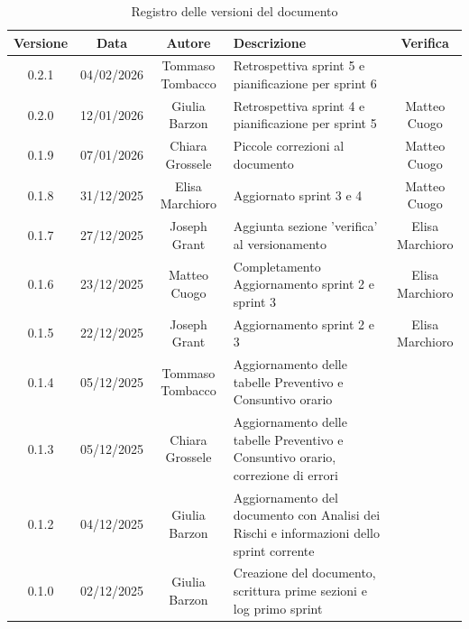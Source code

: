 \documentclass[11pt,a4paper]{article}
\begin{document}
\begin{table}[H]
    \centering
    \begin{tabular}{|c|c|c|>{\raggedright\arraybackslash}p{}|c|}
        \hline
        \textbf{Versione} & \textbf{Data} & \textbf{Autore} & \textbf{Descrizione} & \textbf{Verifica} \\
        \hline
        0.2.1 & 04/02/2026 & Tommaso Tombacco & Retrospettiva sprint 5 e pianificazione per sprint 6 & \\
        \hline
        0.2.0 & 12/01/2026 & Giulia Barzon & Retrospettiva sprint 4 e pianificazione per sprint 5 & Matteo Cuogo\\
        \hline
        0.1.9 & 07/01/2026 & Chiara Grossele & Piccole correzioni al documento & Matteo Cuogo\\ 
        \hline
        0.1.8 & 31/12/2025 & Elisa Marchioro & Aggiornato sprint 3 e 4 & Matteo Cuogo\\ \hline
        0.1.7 & 27/12/2025 & Joseph Grant & Aggiunta sezione 'verifica' al versionamento & Elisa Marchioro\\ \hline
        0.1.6 & 23/12/2025 & Matteo Cuogo & Completamento Aggiornamento sprint 2 e sprint 3 & Elisa Marchioro\\
        \hline
        0.1.5 & 22/12/2025 & Joseph Grant & Aggiornamento sprint 2 e 3 & Elisa Marchioro\\
        \hline
        0.1.4 & 05/12/2025 & Tommaso Tombacco & Aggiornamento delle tabelle Preventivo e Consuntivo orario & \\
        \hline
        0.1.3 & 05/12/2025 & Chiara Grossele & Aggiornamento delle tabelle Preventivo e Consuntivo orario, correzione di errori & \\
        \hline
        0.1.2 & 04/12/2025 & Giulia Barzon & Aggiornamento del documento con Analisi dei Rischi e informazioni dello sprint corrente & \\
        \hline
        0.1.0 & 02/12/2025 & Giulia Barzon & Creazione del documento, scrittura prime sezioni e log primo sprint & \\
        \hline
    \end{tabular}
    \caption{Registro delle versioni del documento}
    \label{tab:versionamento}
\end{table}

\newpage

\tableofcontents
\thispagestyle{empty}
\newpage

\setcounter{page}{1}
\end{document}
